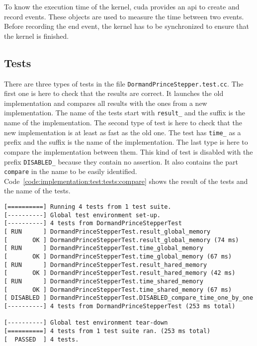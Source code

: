 To know the execution time of the kernel, \acrshort{cuda} provides an \acrshort{api}
to create and record events.
These objects are used to measure the time between two events.
Before recording the end event, the kernel has to be synchronized to ensure
that the kernel is finished.

\subsection{Tests}
\label{ch:implementation:test:tests}

There are three types of tests in the file \texttt{DormandPrinceStepper.test.cc}.
The first one is here to check that the results are correct.
It launches the old implementation and compares all results with the ones from a
new implementation.
The name of the tests start with \texttt{result\_} and the suffix is the name of the
implementation.
The second type of test is here to check that the new implementation is
at least as fast as the old one.
The test has \texttt{time\_} as a prefix and the suffix is the name of the
implementation.
The last type is here to compare the implementation between them.
This kind of test is disabled with the prefix \texttt{DISABLED\_} because
they contain no assertion.
It also contains the part \texttt{compare} in the name to be easily identified.
Code~\ref{code:implementation:test:tests:compare} shows the result of the tests
and the name of the tests.

\begin{code}
    \label{code:implementation:test:tests:compare}
    \begin{verbatim}
[==========] Running 4 tests from 1 test suite.
[----------] Global test environment set-up.
[----------] 4 tests from DormandPrinceStepperTest
[ RUN      ] DormandPrinceStepperTest.result_global_memory
[       OK ] DormandPrinceStepperTest.result_global_memory (74 ms)
[ RUN      ] DormandPrinceStepperTest.time_global_memory
[       OK ] DormandPrinceStepperTest.time_global_memory (67 ms)
[ RUN      ] DormandPrinceStepperTest.result_hared_memory
[       OK ] DormandPrinceStepperTest.result_hared_memory (42 ms)
[ RUN      ] DormandPrinceStepperTest.time_shared_memory
[       OK ] DormandPrinceStepperTest.time_shared_memory (67 ms)
[ DISABLED ] DormandPrinceStepperTest.DISABLED_compare_time_one_by_one
[----------] 4 tests from DormandPrinceStepperTest (253 ms total)

[----------] Global test environment tear-down
[==========] 4 tests from 1 test suite ran. (253 ms total)
[  PASSED  ] 4 tests.
    \end{verbatim}
\end{code}



